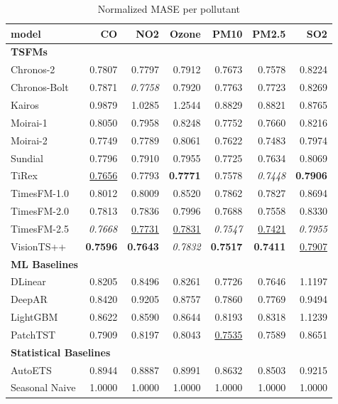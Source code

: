 \begin{table}[H]
\caption{Normalized MASE per pollutant}
\centering
\begin{small}
\begin{tabular}{lrrrrrr}
\toprule
model & CO & NO2 & Ozone & PM10 & PM2.5 & SO2 \\
\midrule
\multicolumn{7}{l}{\textbf{TSFMs}} \\
Chronos-2 & 0.7807 & 0.7797 & 0.7912 & 0.7673 & 0.7578 & 0.8224 \\
Chronos-Bolt & 0.7871 & \textit{0.7758} & 0.7920 & 0.7763 & 0.7723 & 0.8269 \\
Kairos & 0.9879 & 1.0285 & 1.2544 & 0.8829 & 0.8821 & 0.8765 \\
Moirai-1 & 0.8050 & 0.7958 & 0.8248 & 0.7752 & 0.7660 & 0.8216 \\
Moirai-2 & 0.7749 & 0.7789 & 0.8061 & 0.7622 & 0.7483 & 0.7974 \\
Sundial & 0.7796 & 0.7910 & 0.7955 & 0.7725 & 0.7634 & 0.8069 \\
TiRex & \underline{0.7656} & 0.7793 & \textbf{0.7771} & 0.7578 & \textit{0.7448} & \textbf{0.7906} \\
TimesFM-1.0 & 0.8012 & 0.8009 & 0.8520 & 0.7862 & 0.7827 & 0.8694 \\
TimesFM-2.0 & 0.7813 & 0.7836 & 0.7996 & 0.7688 & 0.7558 & 0.8330 \\
TimesFM-2.5 & \textit{0.7668} & \underline{0.7731} & \underline{0.7831} & \textit{0.7547} & \underline{0.7421} & \textit{0.7955} \\
VisionTS++ & \textbf{0.7596} & \textbf{0.7643} & \textit{0.7832} & \textbf{0.7517} & \textbf{0.7411} & \underline{0.7907} \\
\midrule
\multicolumn{7}{l}{\textbf{ML Baselines}} \\
DLinear & 0.8205 & 0.8496 & 0.8261 & 0.7726 & 0.7646 & 1.1197 \\
DeepAR & 0.8420 & 0.9205 & 0.8757 & 0.7860 & 0.7769 & 0.9494 \\
LightGBM & 0.8622 & 0.8590 & 0.8644 & 0.8193 & 0.8318 & 1.1239 \\
PatchTST & 0.7909 & 0.8197 & 0.8043 & \underline{0.7535} & 0.7589 & 0.8651 \\
\midrule
\multicolumn{7}{l}{\textbf{Statistical Baselines}} \\
AutoETS & 0.8944 & 0.8887 & 0.8991 & 0.8632 & 0.8503 & 0.9215 \\
Seasonal Naive & 1.0000 & 1.0000 & 1.0000 & 1.0000 & 1.0000 & 1.0000 \\
\bottomrule
\end{tabular}
\end{small}
\end{table}